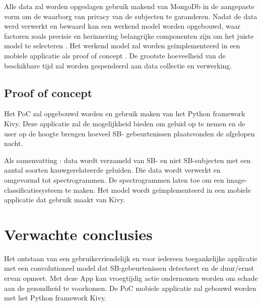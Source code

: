 \documentclass{hogent-article}
\begin{document}
\bigbreak
\noindent
Alle data zal worden opgeslagen gebruik makend van MongoDb in de aangepaste vorm om de waarborg van privacy van de subjecten te garanderen.
\bigbreak
\noindent
Nadat de data werd verwerkt en bewaard kan een werkend model worden opgebouwd, waar factoren zoals precisie en herinnering belangrijke componenten zijn om het juiste model te selecteren . Het werkend model zal worden geïmplementeerd in een mobiele applicatie als proof of concept . De grootste hoeveelheid van de beschikbare tijd zal worden gespendeerd aan data collectie en verwerking.


\subsection{Proof of concept}

Het PoC zal opgebouwd worden en gebruik maken van het Python framework Kivy. Deze applicatie zal de mogelijkheid bieden om geluid op te nemen en de user op de hoogte brengen hoeveel SB- gebeurtenissen plaatsvonden de afgelopen nacht.


\bigbreak
\noindent
Als samenvatting :  data wordt verzameld van SB- en niet SB-subjecten met een aantal soorten kauwgerelateerde geluiden. Die data wordt verwerkt en omgevormd tot spectrogrammen.  De spectrogrammen laten toe om een image- classiﬁcatiesysteem te maken. Het model wordt geïmplementeerd in een mobiele applicatie dat gebruik maakt van Kivy.






\section{Verwachte conclusies}


Het ontstaan van een gebruiksvriendelijk en voor iedereen toegankelijke applicatie met een convolutioneel model dat SB-gebeurtenissen detecteert en de duur/ernst ervan opmeet. Met deze App kan vroegtijdig actie ondernomen worden om schade aan de gezondheid te voorkomen.
\noindent
De PoC mobiele applicatie zal gebouwd worden met het Python framework Kivy. 
\end{document}

